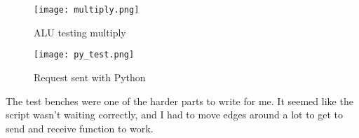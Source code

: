 \documentclass{article}
\begin{document}
\begin{figure}[h!]
  \centering
  \texttt{[image: multiply.png]}
  \caption{ALU testing multiply}
\end{figure}

\begin{figure}[h!]
  \centering
  \texttt{[image: py\_test.png]}
  \caption{Request sent with Python}
\end{figure}


The test benches were one of the harder parts to write for me. It seemed like the script wasn't waiting correctly, and I had to move edges around a lot to get to send and receive function to work.
\end{document}
